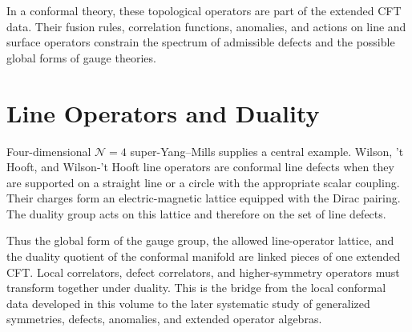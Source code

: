 In a conformal theory, these topological operators are part of the extended
CFT data.  Their fusion rules, correlation functions, anomalies, and actions
on line and surface operators constrain the spectrum of admissible defects and
the possible global forms of gauge theories.

\section{Line Operators and Duality}

Four-dimensional \(\mathcal N=4\) super-Yang--Mills supplies a central
example.  Wilson, 't Hooft, and Wilson-'t Hooft line operators are conformal
line defects when they are supported on a straight line or a circle with the
appropriate scalar coupling.  Their charges form an electric-magnetic lattice
equipped with the Dirac pairing.  The duality group acts on this lattice and
therefore on the set of line defects.

Thus the global form of the gauge group, the allowed line-operator lattice,
and the duality quotient of the conformal manifold are linked pieces of one
extended CFT.  Local correlators, defect correlators, and higher-symmetry
operators must transform together under duality.  This is the bridge from the
local conformal data developed in this volume to the later systematic study of
generalized symmetries, defects, anomalies, and extended operator algebras.
